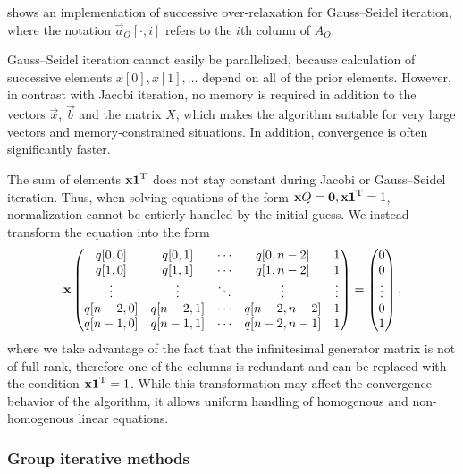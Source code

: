  shows an implementation of
successive over-relaxation for Gauss--Seidel iteration, where the
notation $\vec{a}_O[\cdot, i]$ refers to the $i$th column of $A_O$.

Gauss--Seidel iteration cannot easily be parallelized, because
calculation of successive elements $x[0], x[1], \ldots$ depend on all
of the prior elements. However, in contrast with Jacobi iteration, no
memory is required in addition to the vectors $\vec{x}$, $\vec{b}$ and
the matrix $X$, which makes the algorithm suitable for very large
vectors and memory-constrained situations. In addition, convergence is
often significantly faster.

The sum of elements $\bm{\mathrm{x}} \bm{\mathrm{1}}^{\mathrm{T}}$ does not stay constant during
Jacobi or Gauss--Seidel iteration. Thus, when solving equations of the
form $\bm{\mathrm{x}} Q = \bm{\mathrm{0}}, \bm{\mathrm{x}} \bm{\mathrm{1}}^{\mathrm{T}} = 1$, normalization
cannot be entierly handled by the initial guess. We instead transform
the equation into the form
\begin{equation}
  \label{eq:algorithms:iterative:normalized-linear-system}
  \vec{x} \begin{pmatrix}
    q[0,0] & q[0,1] & \cdots & q[0,n - 2] & 1 \\
    q[1,0] & q[1,1] & \cdots & q[1,n - 2] & 1 \\
    \vdots & \vdots & \ddots & \vdots & \vdots \\
    q[n - 2,0] & q[n - 2,1] & \cdots & q[n - 2,n - 2] & 1 \\
    q[n - 1,0] & q[n - 1,1] & \cdots & q[n - 2,n - 1] & 1 \\
  \end{pmatrix} = \begin{pmatrix}
    0 \\ 0 \\ \vdots \\ 0 \\ 1
  \end{pmatrix} \text,
\end{equation}
where we take advantage of the fact that the infinitesimal generator
matrix is not of full rank, therefore one of the columns is redundant
and can be replaced with the condition $\bm{\mathrm{x}} \bm{\mathrm{1}}^{\mathrm{T}} = 1$. While
this transformation may affect the convergence behavior of the
algorithm, it allows uniform handling of homogenous and non-homogenous
linear equations.

\subsubsection{Group iterative methods}

